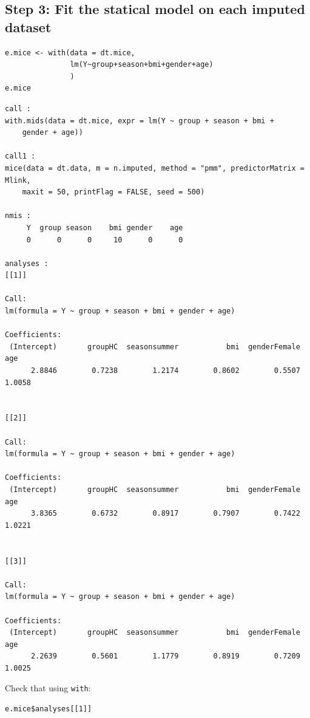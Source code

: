 \documentclass[12pt]{article}
\begin{document}
\clearpage

\subsection{Step 3: Fit the statical model on each imputed dataset}
\label{sec:org254833b}

\lstset{language=r,label= ,caption= ,captionpos=b,numbers=none}
\begin{lstlisting}
e.mice <- with(data = dt.mice,
			   lm(Y~group+season+bmi+gender+age)
			   )
e.mice
\end{lstlisting}

\begin{verbatim}
call :
with.mids(data = dt.mice, expr = lm(Y ~ group + season + bmi + 
    gender + age))

call1 :
mice(data = dt.data, m = n.imputed, method = "pmm", predictorMatrix = Mlink, 
    maxit = 50, printFlag = FALSE, seed = 500)

nmis :
     Y  group season    bmi gender    age 
     0      0      0     10      0      0 

analyses :
[[1]]

Call:
lm(formula = Y ~ group + season + bmi + gender + age)

Coefficients:
 (Intercept)       groupHC  seasonsummer           bmi  genderFemale           age  
      2.8846        0.7238        1.2174        0.8602        0.5507        1.0058  


[[2]]

Call:
lm(formula = Y ~ group + season + bmi + gender + age)

Coefficients:
 (Intercept)       groupHC  seasonsummer           bmi  genderFemale           age  
      3.8365        0.6732        0.8917        0.7907        0.7422        1.0221  


[[3]]

Call:
lm(formula = Y ~ group + season + bmi + gender + age)

Coefficients:
 (Intercept)       groupHC  seasonsummer           bmi  genderFemale           age  
      2.2639        0.5601        1.1779        0.8919        0.7209        1.0025
\end{verbatim}

Check that using \texttt{with}:
\lstset{language=r,label= ,caption= ,captionpos=b,numbers=none}
\begin{lstlisting}
e.mice$analyses[[1]]
\end{lstlisting}
\end{document}
